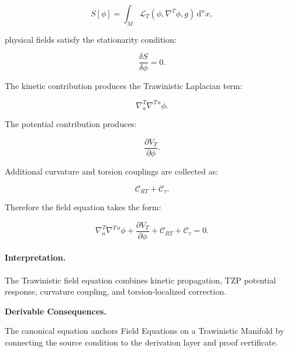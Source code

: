\begin{equation}
S[\phi]
=
\int_M
\mathcal{L}_T
\left(
\phi,\nabla^T\phi,g
\right)
\,\mathrm{d}^n x ,
\end{equation}

physical fields satisfy the stationarity condition:

\begin{equation}
\frac{\delta S}{\delta\phi}=0 .
\end{equation}

The kinetic contribution produces the Trawinistic Laplacian term:

\begin{equation}
\nabla^T_a\nabla^{T\,a}\phi .
\end{equation}

The potential contribution produces:

\begin{equation}
\frac{\partial V_T}{\partial \phi}.
\end{equation}

Additional curvature and torsion couplings are collected as:

\begin{equation}
\mathcal{C}_{RT}
+
\mathcal{C}_{\tau}.
\end{equation}

Therefore the field equation takes the form:

\begin{equation}
\boxed{
\nabla^T_a\nabla^{T\,a}\phi
+
\frac{\partial V_T}{\partial \phi}
+
\mathcal{C}_{RT}
+
\mathcal{C}_{\tau}
=
0 .
}
\end{equation}

\paragraph{Interpretation.}
The Trawinistic field equation combines kinetic propagation, TZP potential response, curvature coupling, and torsion-localized correction.

\par\vspace{0.35em}
\noindent\textbf{Derivable Consequences.}\quad
\begingroup
\footnotesize
\raggedright
The canonical equation anchors Field Equations on a Trawinistic Manifold by connecting the source condition to the derivation layer and proof certificate.
\par\endgroup


